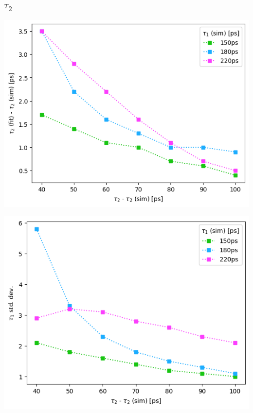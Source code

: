 \subsection*{\LARGE\centering\boldmath$\tau_2$\unboldmath}

\begin{minipage}{.5\linewidth}
    \centering
    \includegraphics[width=\linewidth]{Batch 3/regular IRF/t2-diff 2080.png}
    \label{fig:comp-t2-2080}
\end{minipage}
\begin{minipage}{.5\linewidth}
    \centering
    \includegraphics[width=\linewidth]{Batch 3/regular IRF/t2-err 2080.png}
    \label{fig:comp-t2err-2080}
\end{minipage}
